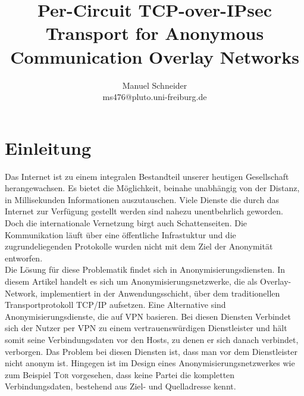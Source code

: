 \documentclass[fleqn,envcountsame,runningheads,10pt,a4paper]{llncs}
\begin{document}
\title{Per-Circuit TCP-over-IPsec Transport for Anonymous Communication Overlay Networks} 
\author{Manuel Schneider\\ms476@pluto.uni-freiburg.de}
\maketitle

\section{Einleitung}
\label{sec:intro}

Das Internet ist zu einem integralen Bestandteil unserer heutigen Gesellschaft herangewachsen. Es bietet die Möglichkeit, beinahe unabhängig von der Distanz, in Millisekunden Informationen auszutauschen. Viele Dienste die durch das Internet zur Verfügung gestellt werden sind nahezu unentbehrlich geworden. Doch die internationale Vernetzung birgt auch Schattenseiten. Die Kommunikation läuft über eine öffentliche Infrastuktur und die zugrundeliegenden Protokolle wurden nicht mit dem Ziel der Anonymität entworfen.\\

Die Lösung für diese Problematik findet sich in Anonymisierungsdiensten. In diesem Artikel handelt es sich um Anonymisierungsnetzwerke, die als Overlay-Network, implementiert in der Anwendungsschicht, über dem traditionellen Transportprotokoll TCP/IP aufsetzen. Eine Alternative sind Anonymisierungsdienste, die auf VPN basieren. Bei diesen Diensten Verbindet sich der Nutzer per VPN zu einem vertrauenswürdigen Dienstleister und hält somit seine Verbindungsdaten vor den Hosts, zu denen er sich danach verbindet, verborgen. Das Problem bei diesen Diensten ist, dass man vor dem Dienstleister nicht anonym ist. Hingegen ist im Design eines Anonymisierungsnetzwerkes wie zum Beispiel \textsc{Tor} vorgesehen, dass keine Partei die kompletten Verbindungsdaten, bestehend aus Ziel- und Quelladresse kennt.\\
\end{document}
